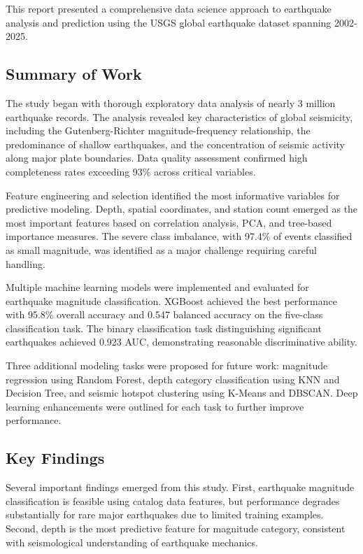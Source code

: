 
This report presented a comprehensive data science approach to earthquake analysis and prediction using the USGS global earthquake dataset spanning 2002-2025.

\subsection{Summary of Work}

The study began with thorough exploratory data analysis of nearly 3 million earthquake records. The analysis revealed key characteristics of global seismicity, including the Gutenberg-Richter magnitude-frequency relationship, the predominance of shallow earthquakes, and the concentration of seismic activity along major plate boundaries. Data quality assessment confirmed high completeness rates exceeding 93\% across critical variables.

Feature engineering and selection identified the most informative variables for predictive modeling. Depth, spatial coordinates, and station count emerged as the most important features based on correlation analysis, PCA, and tree-based importance measures. The severe class imbalance, with 97.4\% of events classified as small magnitude, was identified as a major challenge requiring careful handling.

Multiple machine learning models were implemented and evaluated for earthquake magnitude classification. XGBoost achieved the best performance with 95.8\% overall accuracy and 0.547 balanced accuracy on the five-class classification task. The binary classification task distinguishing significant earthquakes achieved 0.923 AUC, demonstrating reasonable discriminative ability.

Three additional modeling tasks were proposed for future work: magnitude regression using Random Forest, depth category classification using KNN and Decision Tree, and seismic hotspot clustering using K-Means and DBSCAN. Deep learning enhancements were outlined for each task to further improve performance.

\subsection{Key Findings}

Several important findings emerged from this study. First, earthquake magnitude classification is feasible using catalog data features, but performance degrades substantially for rare major earthquakes due to limited training examples. Second, depth is the most predictive feature for magnitude category, consistent with seismological understanding of earthquake mechanics.

